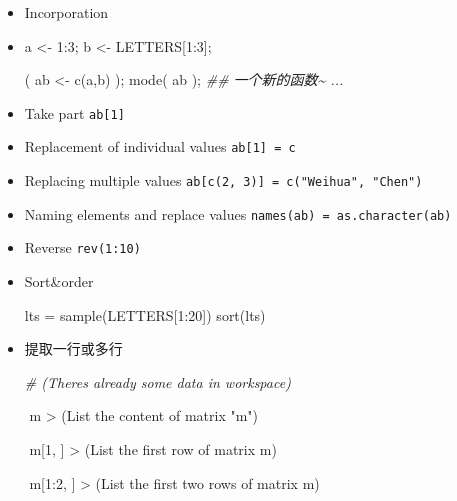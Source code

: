 \documentclass[
]{article}
\newenvironment{Shaded}{}{}
\newcommand{\CommentTok}[1]{\textcolor[rgb]{0.38,0.63,0.69}{\textit{#1}}}
\newcommand{\DecValTok}[1]{\textcolor[rgb]{0.25,0.63,0.44}{#1}}
\newcommand{\DocumentationTok}[1]{\textcolor[rgb]{0.73,0.13,0.13}{\textit{#1}}}
\newcommand{\FunctionTok}[1]{\textcolor[rgb]{0.02,0.16,0.49}{#1}}
\newcommand{\NormalTok}[1]{#1}
\newcommand{\OtherTok}[1]{\textcolor[rgb]{0.00,0.44,0.13}{#1}}
\newcommand{\SpecialCharTok}[1]{\textcolor[rgb]{0.25,0.44,0.63}{#1}}
\newcommand{\StringTok}[1]{\textcolor[rgb]{0.25,0.44,0.63}{#1}}
\begin{document}
\begin{itemize}
\item
  Incorporation
\item
\begin{Shaded}
\begin{Highlighting}[]
\NormalTok{a }\OtherTok{\textless{}{-}} \DecValTok{1}\SpecialCharTok{:}\DecValTok{3}\NormalTok{;}
\NormalTok{b }\OtherTok{\textless{}{-}}\NormalTok{ LETTERS[}\DecValTok{1}\SpecialCharTok{:}\DecValTok{3}\NormalTok{];}

\NormalTok{( ab }\OtherTok{\textless{}{-}} \FunctionTok{c}\NormalTok{(a,b) );}
\FunctionTok{mode}\NormalTok{( ab ); }\DocumentationTok{\#\# 一个新的函数\textasciitilde{} ... }
\end{Highlighting}
\end{Shaded}
\item
  Take part \texttt{ab{[}1{]}}
\item
  Replacement of individual values \texttt{ab{[}1{]}\ =\ c}
\item
  Replacing multiple values
  \texttt{ab{[}c(2,\ 3){]}\ =\ c("Weihua",\ "Chen")}
\item
  Naming elements and replace values
  \texttt{names(ab)\ =\ as.character(ab)}
\item
  Reverse \texttt{rev(1:10)}
\item
  Sort\&order

\begin{Shaded}
\begin{Highlighting}[]
\NormalTok{lts }\OtherTok{=} \FunctionTok{sample}\NormalTok{(LETTERS[}\DecValTok{1}\SpecialCharTok{:}\DecValTok{20}\NormalTok{])}
\FunctionTok{sort}\NormalTok{(lts)}
\end{Highlighting}
\end{Shaded}
\item
  提取一行或多行

\begin{Shaded}
\begin{Highlighting}[]
\CommentTok{\# (There\textquotesingle{}s already some data in workspace)}

\SpecialCharTok{$$}\NormalTok{ m}
\SpecialCharTok{\textgreater{}}\NormalTok{ (List the content of matrix }\StringTok{"m"}\NormalTok{)}

\SpecialCharTok{$$}\NormalTok{ m[}\DecValTok{1}\NormalTok{, ]}
\SpecialCharTok{\textgreater{}}\NormalTok{ (List the first row of matrix }\StringTok{\textquotesingle{}m\textquotesingle{}}\NormalTok{)}

\SpecialCharTok{$$}\NormalTok{ m[}\DecValTok{1}\SpecialCharTok{:}\DecValTok{2}\NormalTok{, ]}
\SpecialCharTok{\textgreater{}}\NormalTok{ (List the first two rows of matrix }\StringTok{\textquotesingle{}m\textquotesingle{}}\NormalTok{)}
\end{Highlighting}
\end{Shaded}


\end{itemize}
\end{document}
